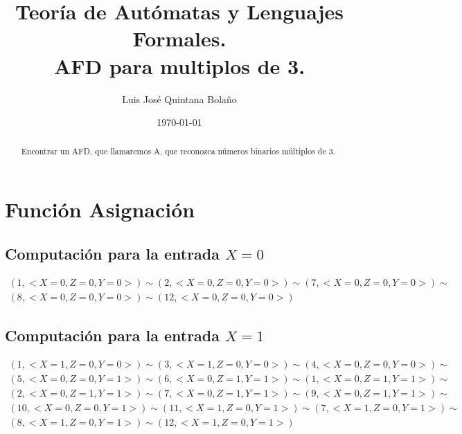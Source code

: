 \documentclass[a4paper]{article}
\title{Teoría de Autómatas y Lenguajes Formales.\\ AFD para multiplos de 3. }
\author{Luis José Quintana Bolaño}
\date{\today}
\begin{document}
		\maketitle
		\begin{abstract}
		    Encontrar un AFD, que llamaremos A, que reconozca números binarios múltiplos de 3.
  		\end{abstract}

  		\section{Función Asignación}
		\subsection{Computación para la entrada $X=0$}
		\begin{equation*}\begin{gathered}
		(1, <X=0, Z=0, Y=0>) \sim (2, <X=0, Z=0, Y=0>) \sim (7, <X=0, Z=0, Y=0>) \sim\\
		(8, <X=0, Z=0, Y=0>) \sim (12, <X=0, Z=0, Y=0>)
		\end{gathered}\end{equation*}
		\subsection{Computación para la entrada $X=1$}
		\begin{equation*}\begin{gathered}
		(1, <X=1, Z=0, Y=0>) \sim (3, <X=1, Z=0, Y=0>) \sim (4, <X=0, Z=0, Y=0>) \sim\\
		(5, <X=0, Z=0, Y=1>) \sim (6, <X=0, Z=1, Y=1>) \sim (1, <X=0, Z=1, Y=1>) \sim\\
		(2, <X=0, Z=1, Y=1>) \sim (7, <X=0, Z=1, Y=1>) \sim (9, <X=0, Z=1, Y=1>) \sim\\
		(10, <X=0, Z=0, Y=1>) \sim (11, <X=1, Z=0, Y=1>) \sim (7, <X=1, Z=0, Y=1>) \sim\\
		(8, <X=1, Z=0, Y=1>) \sim (12, <X=1, Z=0, Y=1>)
		\end{gathered}\end{equation*}
\end{document}
